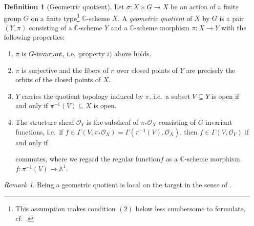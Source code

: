 \documentclass[12pt,a4paper]{amsart}
\theoremstyle{plain}
\theoremstyle{definition}
\newtheorem{defn}[thm]{Definition}
\theoremstyle{remark}
\newtheorem{rem}[thm]{Remark}
\begin{document}
\begin{defn}[Geometric quotient]
  Let $\sigma \colon X \times G \to X$ be an action of a finite group $G$ on a finite type\footnote{This assumption makes condition $(2)$ below less cumbersome to formulate, cf.~\cite[Definition 0.6]{mfk94}.} $\mathbb{C}$-scheme $X$.
  A \textit{geometric quotient} of $X$ by $G$ is a pair $(Y, \pi)$ consisting of a $\mathbb{C}$-scheme $Y$ and a $\mathbb{C}$-scheme morphism $\pi \colon X \to Y$ with the following properties:
  \begin{enumerate}
    \item $\pi$ is $G$-invariant, i.e.~property $i)$ above holds.
    \item $\pi$ is surjective and the fibers of $\pi$ over closed points of $Y$ are precisely the orbits of the closed points of $X$.
    \item $Y$ carries the quotient topology induced by $\pi$, i.e.~a subset $V \subseteq Y$ is open if and only if $\pi^{-1}(V) \subseteq X$ is open.
    \item The structure sheaf $\mathscr{O}_{Y}$ is the subsheaf of $\pi_{*}\mathscr{O}_{X}$ consisting of $G$-invariant functions, i.e.~if $f \in \Gamma(V, \pi_{*}\mathscr{O}_{X}) = \Gamma(\pi^{-1}(V),\mathscr{O}_{X})$, then $f \in \Gamma(V, \mathscr{O}_{Y})$ if and only if

      \begin{center}
      \end{center}
      commutes, where we regard the regular function$f$ as a $\mathbb{C}$-scheme morphism $f \colon \pi^{-1}(V) \to \mathbb{A}^{1}$.
    \end{enumerate}
\end{defn}

\begin{rem}\label{rem:loct}
  Being a geometric quotient is local on the target in the sense of \cite[Appendix C]{gw10}.
\end{rem}
\end{document}
